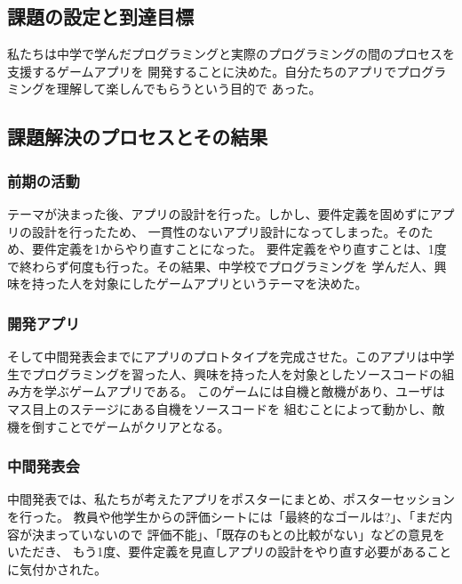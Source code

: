 \documentclass[twocolumn,draft]{jsarticle}
\begin{document}
\subsection{課題の設定と到達目標}
\begin{hissu}
私たちは中学で学んだプログラミングと実際のプログラミングの間のプロセスを支援するゲームアプリを
開発することに決めた。自分たちのアプリでプログラミングを理解して楽しんでもらうという目的で
あった。
\end{hissu}

\subsection{課題解決のプロセスとその結果}

\subsubsection{前期の活動}
\begin{hissu}
テーマが決まった後、アプリの設計を行った。しかし、要件定義を固めずにアプリの設計を行ったため、
一貫性のないアプリ設計になってしまった。そのため、要件定義を1からやり直すことになった。
要件定義をやり直すことは、1度で終わらず何度も行った。その結果、中学校でプログラミングを
学んだ人、興味を持った人を対象にしたゲームアプリというテーマを決めた。
\end{hissu}
\subsubsection{開発アプリ}
\begin{hissu}
そして中間発表会までにアプリのプロトタイプを完成させた。このアプリは中学生でプログラミングを習った人、興味を持った人を対象としたソースコードの組み方を学ぶゲームアプリである。
このゲームには自機と敵機があり、ユーザはマス目上のステージにある自機をソースコードを
組むことによって動かし、敵機を倒すことでゲームがクリアとなる。
\end{hissu}
\subsubsection{中間発表会}
\begin{hissu}
中間発表では、私たちが考えたアプリをポスターにまとめ、ポスターセッションを行った。
教員や他学生からの評価シートには「最終的なゴールは?」、「まだ内容が決まっていないので
評価不能」、「既存のもとの比較がない」などの意見をいただき、
もう1度、要件定義を見直しアプリの設計をやり直す必要があることに気付かされた。
\end{hissu}
\end{document}
